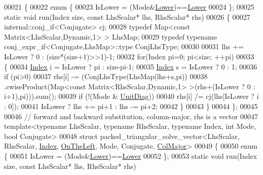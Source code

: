 \begin{DoxyCode}
00021 \{
00022   \textcolor{keyword}{enum} \{
00023     IsLower = (Mode&\hyperlink{group__enums_gga39e3366ff5554d731e7dc8bb642f83cda891792b8ed394f7607ab16dd716f60e6}{Lower})==\hyperlink{group__enums_gga39e3366ff5554d731e7dc8bb642f83cda891792b8ed394f7607ab16dd716f60e6}{Lower}
00024   \};
00025   \textcolor{keyword}{static} \textcolor{keywordtype}{void} run(Index size, \textcolor{keyword}{const} LhsScalar* lhs, RhsScalar* rhs)
00026   \{
00027     internal::conj\_if<Conjugate> cj;
00028     \textcolor{keyword}{typedef} Map<const Matrix<LhsScalar,Dynamic,1> > LhsMap;
00029     \textcolor{keyword}{typedef} \textcolor{keyword}{typename} conj\_expr\_if<Conjugate,LhsMap>::type ConjLhsType;
00030 
00031     lhs += IsLower ? 0 : (size*(size+1)>>1)-1;
00032     \textcolor{keywordflow}{for}(Index pi=0; pi<size; ++pi)
00033     \{
00034       \hyperlink{namespace_eigen_a62e77e0933482dafde8fe197d9a2cfde}{Index} i = IsLower ? pi : size-pi-1;
00035       \hyperlink{namespace_eigen_a62e77e0933482dafde8fe197d9a2cfde}{Index} s = IsLower ? 0 : 1;
00036       \textcolor{keywordflow}{if} (pi>0)
00037     rhs[i] -= (ConjLhsType(LhsMap(lhs+s,pi))
00038         .cwiseProduct(Map<\textcolor{keyword}{const} Matrix<RhsScalar,Dynamic,1> >(rhs+(IsLower ? 0 : i+1),pi))).sum();
00039       \textcolor{keywordflow}{if} (!(Mode & \hyperlink{group__enums_gga39e3366ff5554d731e7dc8bb642f83cdaddb72f888ac85d5a1c52333e54f9374b}{UnitDiag}))
00040     rhs[i] /= cj(lhs[IsLower ? i : 0]);
00041       IsLower ? lhs += pi+1 : lhs -= pi+2;
00042     \}
00043   \}
00044 \};
00045 
00046 \textcolor{comment}{// forward and backward substitution, column-major, rhs is a vector}
00047 \textcolor{keyword}{template}<\textcolor{keyword}{typename} LhsScalar, \textcolor{keyword}{typename} RhsScalar, \textcolor{keyword}{typename} Index, \textcolor{keywordtype}{int} Mode, \textcolor{keywordtype}{bool} Conjugate>
00048 \textcolor{keyword}{struct }packed\_triangular\_solve\_vector<LhsScalar, RhsScalar, \hyperlink{namespace_eigen_a62e77e0933482dafde8fe197d9a2cfde}{Index}, 
      \hyperlink{group__enums_ggac22de43beeac7a78b384f99bed5cee0ba129609b3bdf23b071f5f86cf2f995ec4}{OnTheLeft}, Mode, Conjugate, \hyperlink{group__enums_ggaacded1a18ae58b0f554751f6cdf9eb13a0cbd4bdd0abcfc0224c5fcb5e4f6669a}{ColMajor}>
00049 \{
00050   \textcolor{keyword}{enum} \{
00051     IsLower = (Mode&\hyperlink{group__enums_gga39e3366ff5554d731e7dc8bb642f83cda891792b8ed394f7607ab16dd716f60e6}{Lower})==\hyperlink{group__enums_gga39e3366ff5554d731e7dc8bb642f83cda891792b8ed394f7607ab16dd716f60e6}{Lower}
00052   \};
00053   \textcolor{keyword}{static} \textcolor{keywordtype}{void} run(Index size, \textcolor{keyword}{const} LhsScalar* lhs, RhsScalar* rhs)

\end{DoxyCode}
